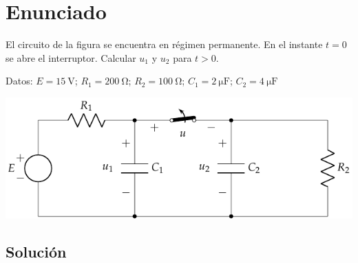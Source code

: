 \section{Enunciado}
El circuito de la figura se encuentra en régimen permanente. En
  el instante $t=0$ se abre el interruptor. Calcular $u_1$ y $u_2$
  para $t>0$.

  Datos:\; $E = \qty{15}{\volt}$;\; $R_1 = \qty{200}{\ohm}$;\;
  $R_2 = \qty{100}{\ohm}$;\; $C_1 = \qty{2}{\micro\farad}$;\;
  $C_2 = \qty{4}{\micro\farad}$

\begin{center}
  \includegraphics{figuras/BT4_02.pdf}
\end{center}

\subsection*{Solución}

